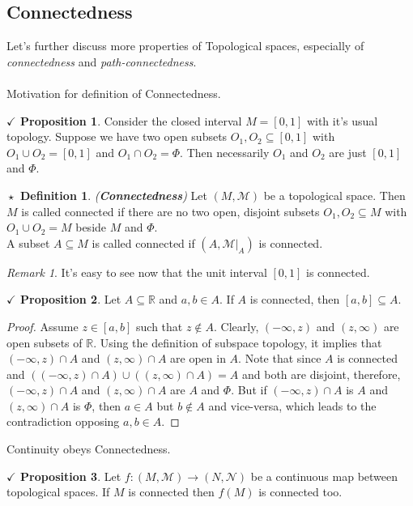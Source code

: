 \documentclass{article}
\theoremstyle{definition}
\newtheorem{definition}{$\boxed{\star}$ Definition}
\newcommand{\tit}[1]{\textit{#1}}
\theoremstyle{remark}
\newtheorem*{remark}{Remark}
\theoremstyle{definition}
\theoremstyle{definition}
\newtheorem{proposition}{$\checkmark$ Proposition}
\newcommand{\topo}[1]{\mathcal{#1}}
\newcommand{\subtopo}[2]{\left. #1 \right\vert_{#2}  }
\begin{document}
\subsection{Connectedness}
Let's further discuss more properties of Topological spaces, especially of \textit{connectedness} and \textit{path-connectedness}.\\\\
\hrulefill
Motivation for definition of Connectedness.
\hrulefill
\begin{proposition}
	Consider the closed interval $ M = [0,1] $ with it's usual topology. Suppose we have two open subsets $ O_1, O_2 \subseteq [0,1] $ with $ O_1 \cup O_2 = [0,1] $ and $ O_1 \cap O_2 = \Phi $. Then necessarily $ O_1 $ and $ O_2 $ are just $ [0,1] $ and $ \Phi $.
\end{proposition}
\hrulefill
\begin{definition}
	\tit{(\textbf{Connectedness})} Let $ (M,\topo{M}) $ be a topological space. Then $ M $ is called connected if there are no two open, disjoint subsets $ O_1,O_2 \subseteq M $ with $ O_1 \cup O_2  = M $ beside $ M $ and $ \Phi $. \\
	A subset $ A \subseteq M $ is called connected if $ \left (A, \subtopo{\topo{M}}{A}\right ) $ is connected.
\end{definition}
\begin{remark}
	It's easy to see now that the unit interval $ [0,1] $ is connected.
\end{remark}
\hrulefill  
\begin{proposition}
	Let $ A\subseteq \mathbb{R} $ and $ a,b \in A $. If $ A $ is connected, then $ [a,b] \subseteq A$.
\end{proposition}
\begin{proof}
	Assume $ z \in [a,b] $ such that $ z\notin A$. Clearly, $ (-\infty,z) $ and $ (z,\infty) $ are open subsets of $ \mathbb{R} $. Using the definition of subspace topology, it implies that $ (-\infty,z) \cap A $ and $ (z,\infty) \cap A $ are open in $ A $. Note that since $ A $ is connected and $ ((-\infty,z) \cap A) \cup ((z,\infty) \cap A) = A $ and both are disjoint, therefore, $ (-\infty,z) \cap A $ and $ (z,\infty) \cap A $ are $ A $ and $ \Phi $. But if $ (-\infty,z) \cap A $ is $ A $ and $ (z,\infty) \cap A $ is $ \Phi $, then $ a \in A $ but $ b \notin A $ and vice-versa, which leads to the contradiction opposing $ a,b \in A $.
\end{proof}
\hrulefill
Continuity obeys Connectedness.
\hrulefill
\begin{proposition}
	Let $ f : (M,\topo{M}) \longrightarrow (N,\topo{N}) $ be a continuous map between topological spaces. If $ M $ is connected then $ f(M) $ is connected too.
\end{proposition}
\end{document}
